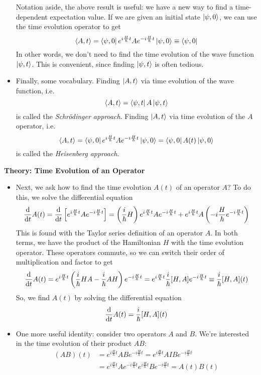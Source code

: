 \documentclass[11pt, a4paper]{article}
\newcommand{\schro}{Schr\"{o}dinger\xspace}
\newcommand{\tev}{e^{-i\frac{H}{\hbar}t}}  %
\newcommand{\tevp}{e^{i\frac{H}{\hbar}t}}  %
\begin{document}
\begin{itemize}
	Notation aside, the above result is useful: we have a new way to find a time-dependent expectation value. If we are given an initial state $ \ket{\psi, 0} $, we can use the time evolution operator to get
	\begin{equation*}
		\ev{A, t} = \bra{\psi, 0}\tevp A \tev \ket{\psi, 0} \equiv  \bra{\psi, 0}
	\end{equation*}
	In other words, we don't need to find the time evolution of the wave function $ \ket{\psi, t} $. This is convenient, since finding $ \ket{\psi, t} $ is often tedious.
	
	\item Finally, some vocabulary. Finding $ \ket{A, t} $ via time evolution of the wave function, i.e. 
	\begin{equation*}
		\ev{A, t} = \bra{\psi, t} A \ket{\psi, t}
	\end{equation*}
	is called the \textit{\schro approach}. Finding $ \ket{A, t} $ via time evolution of the $ A $ operator, i.e. 
	\begin{equation*}
		\ev{A, t} = \bra{\psi, 0}\tevp A \tev \ket{\psi, 0} = \bra{\psi, 0} A(t) \ket{\psi, 0}
	\end{equation*}
	is called the \textit{Heisenberg approach}. 
\end{itemize}
\textbf{Theory: Time Evolution of an Operator}
\begin{itemize}
	\item Next, we ask how to find the time evolution $ A(t) $ of an operator $ A $? To do this, we solve the differential equation
	\begin{equation*}
		\dv{t}A(t) = \dv{t}\left[\tevp A \tev \right] = \left(\frac{i}{\hbar}H\right)\tevp A \tev + \tevp A\left(-i\frac{H}{\hbar}\tev\right)
	\end{equation*}
	This is found with the Taylor series definition of an operator $ A $. In both terms, we have the product of the Hamiltonian $ H $ with the time evolution operator. These operators commute, so we can switch their order of multiplication and factor to get
	\begin{equation*}
		\dv{t}A(t) = \tevp \left(\frac{i}{\hbar}HA - \frac{i}{\hbar}AH\right) \tev = \tevp \frac{i}{\hbar}[H, A]\tev \equiv \frac{i}{\hbar}[H, A](t)
	\end{equation*}
	So, we find $ A(t) $ by solving the differential equation
	\begin{equation*}
		\dv{t}A(t) = \frac{i}{\hbar}[H, A](t)
	\end{equation*}
	
	\item One more useful identity: consider two operators $ A $ and $ B $. We're interested in the time evolution of their product $ AB $: 
	\begin{align*}
		(AB)(t) &= \tevp AB \tev = \tevp A I B \tev\\
		&=\tevp A \tev \tevp B \tev = A(t)B(t)
	\end{align*}

\end{itemize}
\end{document}
